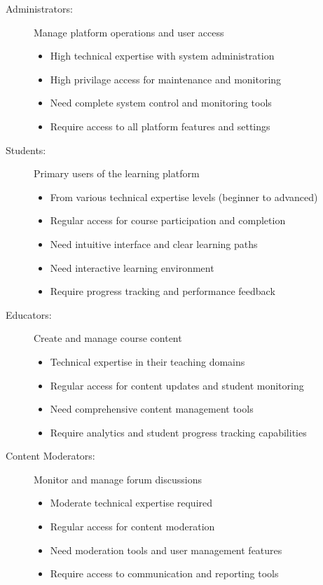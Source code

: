 \documentclass[a4paper, 11pt]{scrreprt}
\begin{document}
\begin{description}
    \item[Administrators:] Manage platform operations and user access
        \begin{itemize}[leftmargin=*]
            \item High technical expertise with system administration
            \item High privilage access for maintenance and monitoring
            \item Need complete system control and monitoring tools
            \item Require access to all platform features and settings
        \end{itemize}

    \item[Students:] Primary users of the learning platform
        \begin{itemize}[leftmargin=*]
            \item From various technical expertise levels (beginner to advanced)
            \item Regular access for course participation and completion
            \item Need intuitive interface and clear learning paths
            \item Need interactive learning environment
            \item Require progress tracking and performance feedback
        \end{itemize}
    
    \item[Educators:] Create and manage course content
        \begin{itemize}[leftmargin=*]
            \item Technical expertise in their teaching domains
            \item Regular access for content updates and student monitoring
            \item Need comprehensive content management tools
            \item Require analytics and student progress tracking capabilities
        \end{itemize}
    
    \item[Content Moderators:] Monitor and manage forum discussions
        \begin{itemize}[leftmargin=*]
            \item Moderate technical expertise required
            \item Regular access for content moderation
            \item Need moderation tools and user management features
            \item Require access to communication and reporting tools
        \end{itemize}
\end{description}
\end{document}
